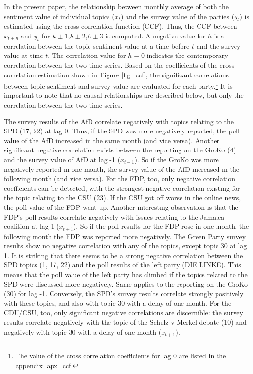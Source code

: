 \documentclass[12pt,a4paper,notitlepage]{article}
\begin{document}
In the present paper, the relationship between monthly average of both the sentiment value of individual topics ($x_t$) and the survey value of the parties ($y_t$) is estimated using the cross correlation function (CCF). Thus, the CCF between $x_{t+h}$ and $y_t$ for $h\pm 1$,$h \pm 2$,$h \pm 3$ is computed. A negative value for $h$ is a correlation between the topic sentiment value at a time before $t$ and the survey value at time $t$. The correlation value for $h=0$ indicates the contemporary correlation between the two time series.  Based on the coefficients of the cross correlation estimation shown in Figure \ref{fig_ccf}, the significant correlations between topic sentiment and survey value are evaluated for each party.\footnote{The value of the cross correlation coefficients for lag 0 are listed in the appendix \ref{apx_ccf}} It is important to note that no causal relationships are described below, but only the correlation between the two time series. 

The survey results of the AfD correlate negatively with topics relating to the SPD (17, 22) at lag 0. Thus, if the SPD was more negatively reported, the poll value of the AfD increased in the same month (and vice versa). Another significant negative correlation exists between the reporting on the GroKo (4) and the survey value of AfD at lag -1 ($x_{t-1}$). So if the GroKo was more negatively reported in one month, the survey value of the AfD increased in the following month (and vice versa). For the FDP, too, only negative correlation coefficients can be detected, with the strongest negative correlation existing for the topic relating to the CSU (23). If the CSU got off worse in the online news, the poll value of the FDP went up. Another interesting observation is that the FDP's poll results correlate negatively with issues relating to the Jamaica coalition at lag 1 ($x_{t+1}$). So if the poll results for the FDP rose in one month, the following month the FDP was reported more negatively. The Green Party survey results show no negative correlation with any of the topics, except topic 30 at lag 1. It is striking that there seems to be a strong negative correlation between the SPD topics (1, 17, 22) and the poll results of the left party (DIE LINKE). This means that the poll value of the left party has climbed if the topics related to the SPD were discussed more negatively. Same applies to the reporting on the GroKo (30) for lag -1. Conversely, the SPD's survey results correlate strongly positively with these topics, and also with topic 30 with a delay of one month. For the CDU/CSU, too, only significant negative correlations are discernible: the survey results correlate negatively with the topic of the Schulz v Merkel debate (10) and negatively with topic 30 with a delay of one month ($x_{t+1}$). 
\end{document}

